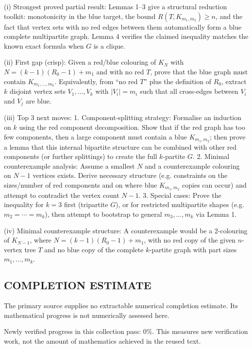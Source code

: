 (i) Strongest proved partial result: Lemmas 1–3 give a structural reduction toolkit: monotonicity in the blue target, the bound $R(T,K_{m_1,m_2})\ge n$, and the fact that vertex sets with no red edges between them automatically form a blue complete multipartite graph. Lemma 4 verifies the claimed inequality matches the known exact formula when $G$ is a clique.

(ii) First gap (crisp): Given a red/blue colouring of $K_N$ with $N=(k-1)(R_0-1)+m_1$ and with no red $T$, prove that the blue graph must contain $K_{m_1,\dots,m_k}$. Equivalently, from “no red $T$” plus the definition of $R_0$, extract $k$ disjoint vertex sets $V_1,\dots,V_k$ with $|V_i|=m_i$ such that all cross-edges between $V_i$ and $V_j$ are blue.

(iii) Top 3 next moves:
1. Component-splitting strategy: Formalise an induction on $k$ using the red component decomposition. Show that if the red graph has too few components, then a large component must contain a blue $K_{m_1,m_2}$; then prove a lemma that this internal bipartite structure can be combined with other red components (or further splittings) to create the full $k$-partite $G$.
2. Minimal counterexample analysis: Assume a smallest $N$ and a counterexample colouring on $N-1$ vertices exists. Derive necessary structure (e.g. constraints on the sizes/number of red components and on where blue $K_{m_1,m_2}$ copies can occur) and attempt to contradict the vertex count $N-1$.
3. Special cases: Prove the inequality for $k=3$ first (tripartite $G$), or for restricted multipartite shapes (e.g. $m_2=\cdots=m_k$), then attempt to bootstrap to general $m_3,\dots,m_k$ via Lemma 1.

(iv) Minimal counterexample structure: A counterexample would be a 2-colouring of $K_{N-1}$, where $N=(k-1)(R_0-1)+m_1$, with no red copy of the given $n$-vertex tree $T$ and no blue copy of the complete $k$-partite graph with part sizes $m_1,\dots,m_k$.



\subsection*{COMPLETION ESTIMATE}
The primary source supplies no extractable numerical completion estimate. Its mathematical progress is not numerically assessed here.

Newly verified progress in this collection pass: $0\%$. This measures new verification work, not the amount of mathematics achieved in the reused text.
